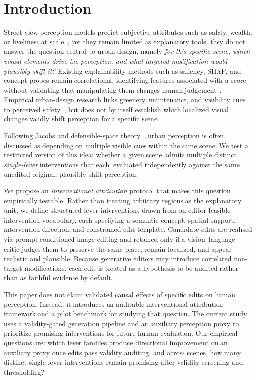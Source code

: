 \section{Introduction}
\label{sec:intro}

Street-view perception models predict subjective attributes such as
safety, wealth, or liveliness at
scale~\cite{salesses2013,naik2014,dubey2016}, yet they remain limited as
explanatory tools: they do not answer the question central to urban
design, namely \emph{for this specific scene, which visual elements
drive the perception, and what targeted modification would plausibly
shift it?} Existing explainability methods such as saliency, SHAP, and
concept probes remain correlational, identifying features associated
with a score without validating that manipulating them changes human
judgement~\cite{adebayo2018,kim2018}. Empirical urban-design research
links greenery, maintenance, and visibility cues to perceived
safety~\cite{jacobs1961,newman1972,li2015greenery,jiang2018brokenwindows,portnov2020lighting},
but does not by itself establish which localized visual changes validly
shift perception for a specific scene.

Following Jacobs and defensible-space
theory~\cite{jacobs1961,newman1972}, urban perception is often discussed
as depending on multiple visible cues within the same scene. We test a
restricted version of this idea: whether a given scene admits multiple
distinct \emph{single-lever} interventions that each, evaluated
independently against the same unedited original, plausibly shift
perception.

We propose an \emph{interventional attribution} protocol that makes
this question empirically testable. Rather than treating arbitrary
regions as the explanatory unit, we define structured lever
interventions drawn from an editor-feasible intervention vocabulary,
each specifying a semantic concept, spatial support, intervention
direction, and constrained edit template. Candidate edits are realised
via prompt-conditioned image editing and retained only if a
vision--language critic judges them to preserve the same place, remain
localized, and appear realistic and plausible. Because generative
editors may introduce correlated non-target modifications, each edit is
treated as a hypothesis to be audited rather than as faithful evidence
by default.

This paper does not claim validated causal effects of specific edits on
human perception. Instead, it introduces an auditable interventional
attribution framework and a pilot benchmark for studying that question.
The current study uses a validity-gated generation pipeline and an
auxiliary perception proxy to prioritize promising interventions for
future human evaluation. Our empirical questions are: which lever
families produce directional improvement on an auxiliary proxy once
edits pass validity auditing, and across scenes, how many distinct
single-lever interventions remain promising after validity screening and
thresholding?
